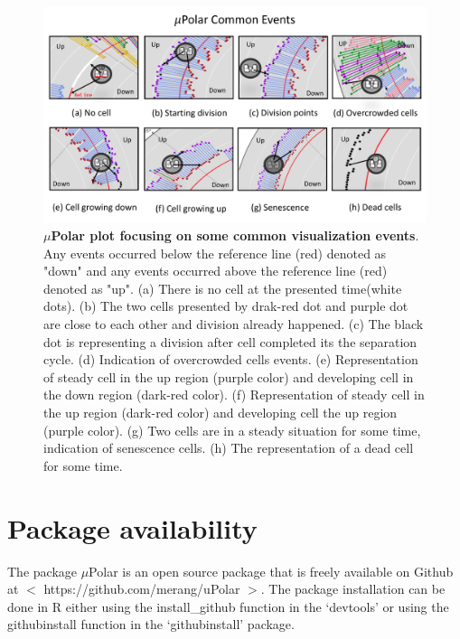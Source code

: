 \documentclass[conference]{IEEEtran}
\begin{document}
\begin{figure}
\centering
\includegraphics[width=\textwidth,height=10 cm]{Patterns/read.pdf}
\caption{\textbf{ $\mu$Polar plot focusing on some common visualization events}. Any events occurred below the reference line (red) denoted as "down" and any events occurred above the reference line (red) denoted as "up". (a) There is no cell at the presented time(white dots). (b) The two cells presented by  drak-red dot and purple dot are close to each other and division already happened. (c) The black dot is representing a division after cell completed its the separation cycle. (d) Indication of overcrowded cells events. (e) Representation of steady cell in the up region (purple color) and developing cell in the down region (dark-red color). (f) Representation of steady cell in the up region (dark-red color) and developing cell the up region (purple color). (g) Two cells are in a steady situation for some time, indication of senescence cells. (h) The representation of a dead cell for some time.}
\label{fig:read}
\end{figure}


\section{Package availability}
The package $\mu$Polar is an open source package that is freely available on Github at $<$ https://github.com/merang/uPolar $>$. The package installation can be done in R either using the install\_github function in the ‘devtools’ or using the githubinstall function in the ‘githubinstall’ package. 
\end{document}
